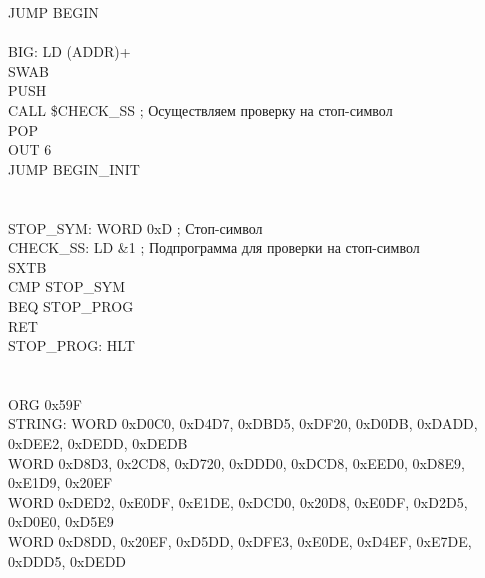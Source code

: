 \hspace*{2.5cm} JUMP BEGIN\\
\\
BIG:\hspace*{17mm}	LD (ADDR)+\\
\hspace*{2.5cm} SWAB\\
\hspace*{2.5cm} PUSH\\
\hspace*{2.5cm} CALL \$CHECK\_SS ; Осуществляем проверку на стоп-символ\\
\hspace*{2.5cm} POP\\
\hspace*{2.5cm} OUT 6\\
\hspace*{2.5cm} JUMP BEGIN\_INIT\\
\\
\\
STOP\_SYM:\hspace*{3mm}	WORD 0xD ; Стоп-символ\\
CHECK\_SS:\hspace*{3mm}	LD \&1 ; Подпрограмма для проверки на стоп-символ\\
\hspace*{2.5cm} SXTB\\
\hspace*{2.5cm} CMP STOP\_SYM\\
\hspace*{2.5cm} BEQ STOP\_PROG\\
\hspace*{2.5cm} RET\\
STOP\_PROG:\hspace*{1mm} HLT\\
\\
\\
\hspace*{2.4cm} ORG 0x59F\\
STRING: \hspace*{9mm}WORD 0xD0C0, 0xD4D7, 0xDBD5, 0xDF20, 0xD0DB, 0xDADD, 0xDEE2, 0xDEDD, 0xDEDB\\
\hspace*{25mm}WORD 0xD8D3, 0x2CD8, 0xD720, 0xDDD0, 0xDCD8, 0xEED0, 0xD8E9, 0xE1D9, 0x20EF\\
\hspace*{25mm}WORD 0xDED2, 0xE0DF, 0xE1DE, 0xDCD0, 0x20D8, 0xE0DF, 0xD2D5, 0xD0E0, 0xD5E9\\
\hspace*{25mm}WORD 0xD8DD, 0x20EF, 0xD5DD, 0xDFE3, 0xE0DE, 0xD4EF, 0xE7DE, 0xDDD5, 0xDEDD\\
